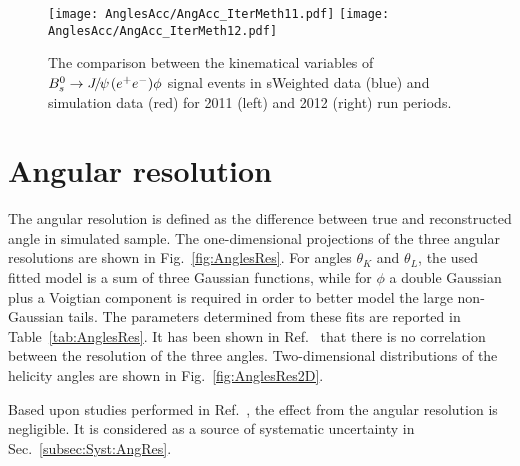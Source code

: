 \begin{figure}[hbt]
  \begin{center}
    \texttt{[image: AnglesAcc/AngAcc\_IterMeth11.pdf]}
    \texttt{[image: AnglesAcc/AngAcc\_IterMeth12.pdf]}
     \vspace*{-0.5cm}
  \end{center}
    \caption{
    The comparison between the kinematical variables of ${{B}^0_{s}}\rightarrow{\ensuremath{{J\mskip -3mu/\mskip -2mu\psi\mskip 2mu}}}({e^+e^-})\phi$ signal events in sWeighted data (blue) and simulation data (red) for 2011 (left) and 2012 (right) run periods.
}
  \label{fig:AnglesAcc_IterMeth} 
\end{figure}
\clearpage

\section{Angular resolution}\label{sec:AngRes}

The angular resolution is defined as the difference between true and reconstructed angle in simulated sample. The one-dimensional projections of the three angular resolutions are shown in Fig.~\ref{fig:AnglesRes}. For angles $\theta_{K}$ and $\theta_{L}$, the used fitted model is a sum of three Gaussian functions, while for $\phi$ a double Gaussian plus a Voigtian component is required in order to better model the large non-Gaussian tails. The parameters determined from these fits are reported in Table~\ref{tab:AnglesRes}. It has been shown in Ref.~\cite{Aaij:2014-039} that there is no correlation between the resolution of the three angles. Two-dimensional distributions of the helicity angles are shown in Fig.~\ref{fig:AnglesRes2D}. 

Based upon studies performed in Ref.~\cite{Aaij:2014-039}, the effect from the angular resolution is negligible. It is considered as a source of systematic uncertainty in Sec.~\ref{subsec:Syst:AngRes}.

